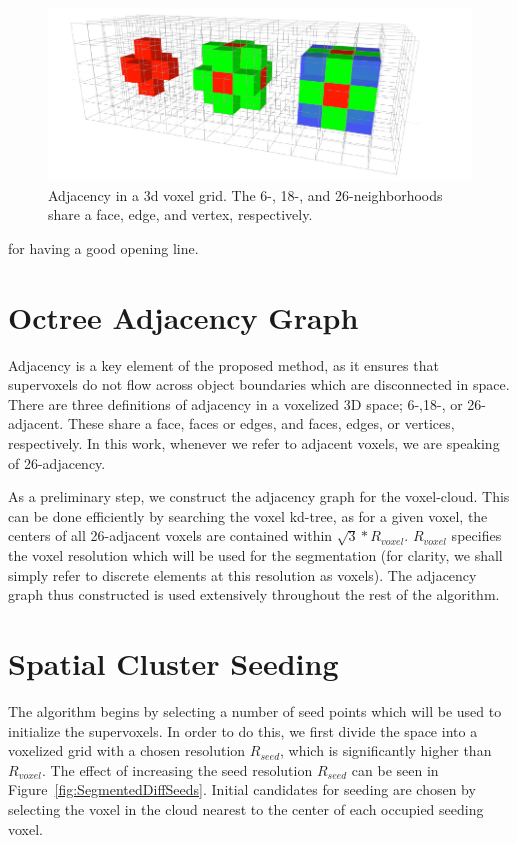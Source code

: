 \begin{figure}[t]
\begin{center}
\includegraphics[width=0.9\linewidth]{figures/WorldModel/3d_nearest_neigh.png}
\end{center}
   \caption[Adjacency in a 3d Grid]{Adjacency in a 3d voxel grid. The 6-, 18-, and 26-neighborhoods share a face, edge, and vertex, respectively.}
\label{fig:stanford_bunny}
\end{figure}


 for having a good opening line. 
\section{Octree Adjacency Graph}
\label{subsec:Adjacency}
Adjacency is a key element of the proposed method, as it ensures that supervoxels do not flow across object boundaries which are disconnected in space. There are three definitions of adjacency in a voxelized 3D space; 6-,18-, or 26-adjacent. These share a face, faces or edges, and faces, edges, or vertices, respectively. In this work, whenever we refer to adjacent voxels, we are speaking of 26-adjacency. 

As a preliminary step, we construct the adjacency graph for the voxel-cloud. This can be done efficiently by searching the voxel kd-tree, as for a given voxel, the centers of all 26-adjacent voxels are contained within $\sqrt{3}*R_{voxel}$. ${R}_{voxel}$ specifies the voxel resolution which will be used for the segmentation (for clarity, we shall simply refer to discrete elements at this resolution as voxels). The adjacency graph thus constructed is used extensively throughout the rest of the algorithm.

\section{Spatial Cluster Seeding}
\label{subsec:Seeding}
The algorithm begins by selecting a number of seed points which will be used to initialize the supervoxels. In order to do this, we first divide the space into a voxelized grid with a chosen resolution ${R}_{seed}$, which is significantly higher than ${R}_{voxel}$. The effect of increasing the seed resolution ${R}_{seed}$ can be seen in Figure~\ref{fig:SegmentedDiffSeeds}. Initial candidates for seeding are chosen by selecting the voxel in the cloud nearest to the center of each occupied seeding voxel.    

